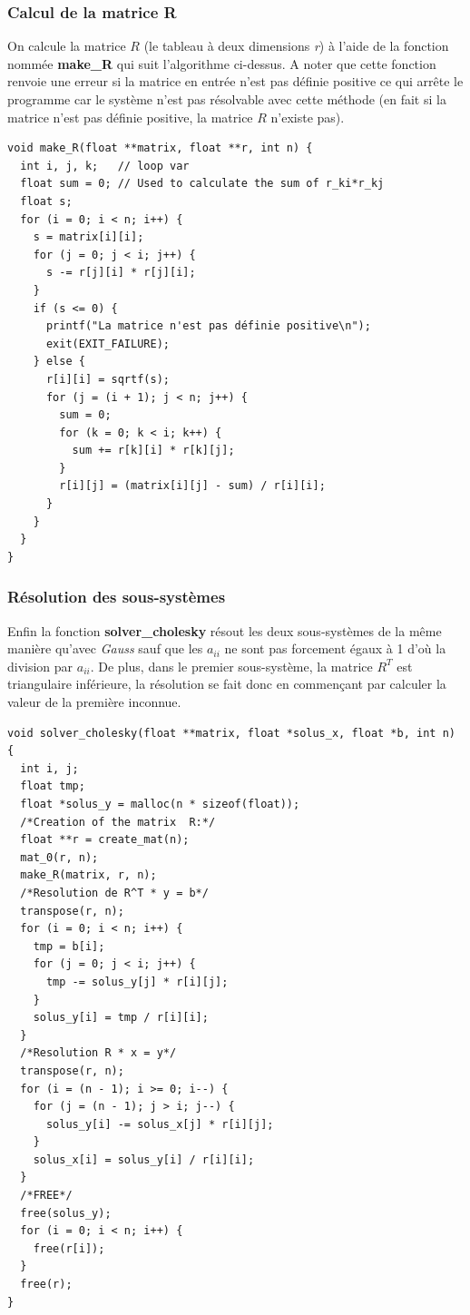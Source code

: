 \documentclass[a4paper]{article}
\begin{document}
\clearpage

\subsubsection{Calcul de la matrice R}

On calcule la matrice $R$ (le tableau à deux dimensions \textit{r}) à
l'aide de la fonction nommée \textbf{make\_R} qui suit l'algorithme ci-dessus. A
noter que cette fonction renvoie une erreur si la matrice en entrée n'est pas
définie positive ce qui arrête le programme car le système n'est pas résolvable
avec cette méthode (en fait si la matrice n'est pas définie positive, la matrice
$R$ n'existe pas).

\begin{lstlisting}
void make_R(float **matrix, float **r, int n) {
  int i, j, k;   // loop var
  float sum = 0; // Used to calculate the sum of r_ki*r_kj
  float s;
  for (i = 0; i < n; i++) {
    s = matrix[i][i];
    for (j = 0; j < i; j++) {
      s -= r[j][i] * r[j][i];
    }
    if (s <= 0) {
      printf("La matrice n'est pas définie positive\n");
      exit(EXIT_FAILURE);
    } else {
      r[i][i] = sqrtf(s);
      for (j = (i + 1); j < n; j++) {
        sum = 0;
        for (k = 0; k < i; k++) {
          sum += r[k][i] * r[k][j];
        }
        r[i][j] = (matrix[i][j] - sum) / r[i][i];
      }
    }
  }
}
\end{lstlisting}

\subsubsection{Résolution des sous-systèmes}

Enfin la fonction \textbf{solver\_cholesky} résout les deux sous-systèmes de la
même manière qu'avec \textit{Gauss} sauf que les $a_{ii}$ ne sont pas forcement
égaux à 1 d'où la division par $a_{ii}$. De plus, dans le premier sous-système,
la matrice $R^{T}$ est triangulaire inférieure, la résolution se fait donc en
commençant par calculer la valeur de la première inconnue.

\begin{lstlisting}
void solver_cholesky(float **matrix, float *solus_x, float *b, int n) {
  int i, j;
  float tmp;
  float *solus_y = malloc(n * sizeof(float));
  /*Creation of the matrix  R:*/
  float **r = create_mat(n);
  mat_0(r, n);
  make_R(matrix, r, n);
  /*Resolution de R^T * y = b*/
  transpose(r, n);
  for (i = 0; i < n; i++) {
    tmp = b[i];
    for (j = 0; j < i; j++) {
      tmp -= solus_y[j] * r[i][j];
    }
    solus_y[i] = tmp / r[i][i];
  }
  /*Resolution R * x = y*/
  transpose(r, n);
  for (i = (n - 1); i >= 0; i--) {
    for (j = (n - 1); j > i; j--) {
      solus_y[i] -= solus_x[j] * r[i][j];
    }
    solus_x[i] = solus_y[i] / r[i][i];
  }
  /*FREE*/
  free(solus_y);
  for (i = 0; i < n; i++) {
    free(r[i]);
  }
  free(r);
}
\end{lstlisting}
\end{document}
